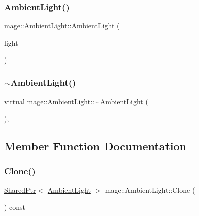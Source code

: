 \hypertarget{classmage_1_1_ambient_light_a17787dd0d4df87a85c903503b594e51c}{}\label{classmage_1_1_ambient_light_a17787dd0d4df87a85c903503b594e51c} 
\subsubsection{\texorpdfstring{Ambient\+Light()}{AmbientLight()}\hspace{0.1cm}{\footnotesize\ttfamily [3/3]}}
{\footnotesize\ttfamily mage\+::\+Ambient\+Light\+::\+Ambient\+Light (\begin{DoxyParamCaption}\item[{\hyperlink{classmage_1_1_ambient_light}{Ambient\+Light} \&\&}]{light }\end{DoxyParamCaption})\hspace{0.3cm}{\ttfamily [default]}}

\hypertarget{classmage_1_1_ambient_light_aa1c8811eaff210760c8d5563a3669bd0}{}\label{classmage_1_1_ambient_light_aa1c8811eaff210760c8d5563a3669bd0} 
\subsubsection{\texorpdfstring{$\sim$\+Ambient\+Light()}{~AmbientLight()}}
{\footnotesize\ttfamily virtual mage\+::\+Ambient\+Light\+::$\sim$\+Ambient\+Light (\begin{DoxyParamCaption}{ }\end{DoxyParamCaption})\hspace{0.3cm}{\ttfamily [virtual]}, {\ttfamily [default]}}



\subsection{Member Function Documentation}
\hypertarget{classmage_1_1_ambient_light_aeab3d0316851c0267e92e7e504cff888}{}\label{classmage_1_1_ambient_light_aeab3d0316851c0267e92e7e504cff888} 
\subsubsection{\texorpdfstring{Clone()}{Clone()}}
{\footnotesize\ttfamily \hyperlink{namespacemage_a1e01ae66713838a7a67d30e44c67703e}{Shared\+Ptr}$<$ \hyperlink{classmage_1_1_ambient_light}{Ambient\+Light} $>$ mage\+::\+Ambient\+Light\+::\+Clone (\begin{DoxyParamCaption}{ }\end{DoxyParamCaption}) const}

